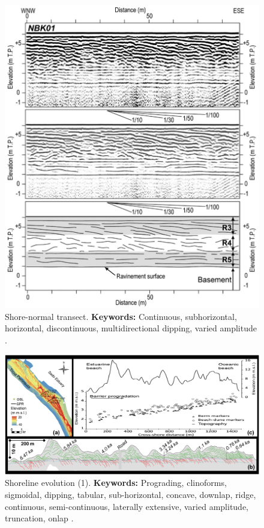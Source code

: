 \begin{figure}[h!]
    \centering
    \includegraphics[width=0.9\linewidth]{Figures/0.2GPR/Tamura2008_4.png}
    \caption[Shore-normal transect (2).]{Shore-normal transect. \textbf{Keywords: } Continuous, subhorizontal, horizontal, discontinuous, multidirectional dipping, varied amplitude  \citep{Tamura2008}.}
    \label{fig:Tamura2008-4}
\end{figure}
\begin{landscape}
    \begin{figure}[h!]
    \centering
    \includegraphics[width=0.9\linewidth]{Figures/0.2GPR/dougherty2019-1.png}
    \caption[Shoreline evolution (1).]{Shoreline evolution (1). \textbf{Keywords: } Prograding, clinoforms, sigmoidal, dipping, tabular, sub-horizontal, concave, downlap, ridge, continuous, semi-continuous, laterally extensive, varied amplitude, truncation, onlap \citep{Dougherty2019}.}
    \label{fig:dougherty2019-1}
\end{figure}
\end{landscape}

